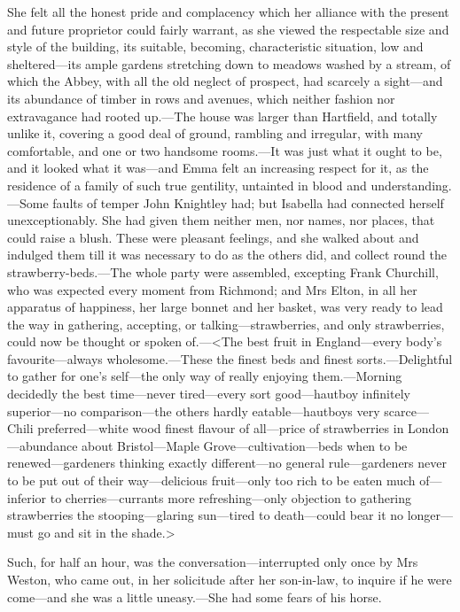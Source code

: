 She felt all the honest pride and complacency which her alliance with the present and future proprietor could fairly warrant, as she viewed the respectable size and style of the building, its suitable, becoming, characteristic situation, low and sheltered—its ample gardens stretching down to meadows washed by a stream, of which the Abbey, with all the old neglect of prospect, had scarcely a sight—and its abundance of timber in rows and avenues, which neither fashion nor extravagance had rooted up.—The house was larger than Hartfield, and totally unlike it, covering a good deal of ground, rambling and irregular, with many comfortable, and one or two handsome rooms.—It was just what it ought to be, and it looked what it was—and Emma felt an increasing respect for it, as the residence of a family of such true gentility, untainted in blood and understanding.—Some faults of temper John Knightley had; but Isabella had connected herself unexceptionably. She had given them neither men, nor names, nor places, that could raise a blush. These were pleasant feelings, and she walked about and indulged them till it was necessary to do as the others did, and collect round the strawberry-beds.—The whole party were assembled, excepting Frank Churchill, who was expected every moment from Richmond; and Mrs Elton, in all her apparatus of happiness, her large bonnet and her basket, was very ready to lead the way in gathering, accepting, or talking—strawberries, and only strawberries, could now be thought or spoken of.—<The best fruit in England—every body's favourite—always wholesome.—These the finest beds and finest sorts.—Delightful to gather for one's self—the only way of really enjoying them.—Morning decidedly the best time—never tired—every sort good—hautboy infinitely superior—no comparison—the others hardly eatable—hautboys very scarce—Chili preferred—white wood finest flavour of all—price of strawberries in London—abundance about Bristol—Maple Grove—cultivation—beds when to be renewed—gardeners thinking exactly different—no general rule—gardeners never to be put out of their way—delicious fruit—only too rich to be eaten much of—inferior to cherries—currants more refreshing—only objection to gathering strawberries the stooping—glaring sun—tired to death—could bear it no longer—must go and sit in the shade.>

Such, for half an hour, was the conversation—interrupted only once by Mrs Weston, who came out, in her solicitude after her son-in-law, to inquire if he were come—and she was a little uneasy.—She had some fears of his horse.

